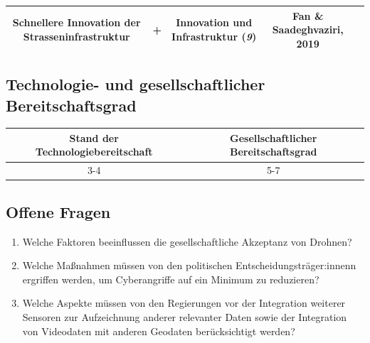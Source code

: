 \documentclass[
]{book}
\providecommand{\tightlist}{%
  \setlength{\itemsep}{0pt}\setlength{\parskip}{0pt}}
\begin{document}
\begin{longtable}[]{@{}ccccc@{}}
\begin{minipage}[t]{0.16\columnwidth}
Schnellere Innovation der Strasseninfrastruktur\strut
\end{minipage} & \begin{minipage}[t]{0.17\columnwidth}\centering
\textbf{+}\strut
\end{minipage} & \begin{minipage}[t]{0.17\columnwidth}\centering
Innovation und Infrastruktur (\emph{9})\strut
\end{minipage} & \begin{minipage}[t]{0.17\columnwidth}\centering
Fan \& Saadeghvaziri, 2019\strut
\end{minipage}\tabularnewline
\bottomrule
\end{longtable}

\hypertarget{technologie--und-gesellschaftlicher-bereitschaftsgrad-5}{%
\subsection*{Technologie- und gesellschaftlicher Bereitschaftsgrad}\label{technologie--und-gesellschaftlicher-bereitschaftsgrad-5}}

\begin{longtable}[]{@{}cc@{}}
\toprule
Stand der Technologiebereitschaft & Gesellschaftlicher Bereitschaftsgrad\tabularnewline
\midrule
\endhead
3-4 & 5-7\tabularnewline
\bottomrule
\end{longtable}

\hypertarget{offene-fragen-7}{%
\subsection*{Offene Fragen}\label{offene-fragen-7}}

\begin{enumerate}
\def\labelenumi{\arabic{enumi}.}
\tightlist
\item
  Welche Faktoren beeinflussen die gesellschaftliche Akzeptanz von Drohnen?
\item
  Welche Maßnahmen müssen von den politischen Entscheidungsträger:innenn ergriffen werden, um Cyberangriffe auf ein Minimum zu reduzieren?
\item
  Welche Aspekte müssen von den Regierungen vor der Integration weiterer Sensoren zur Aufzeichnung anderer relevanter Daten sowie der Integration von Videodaten mit anderen Geodaten berücksichtigt werden?
\end{enumerate}
\end{document}
